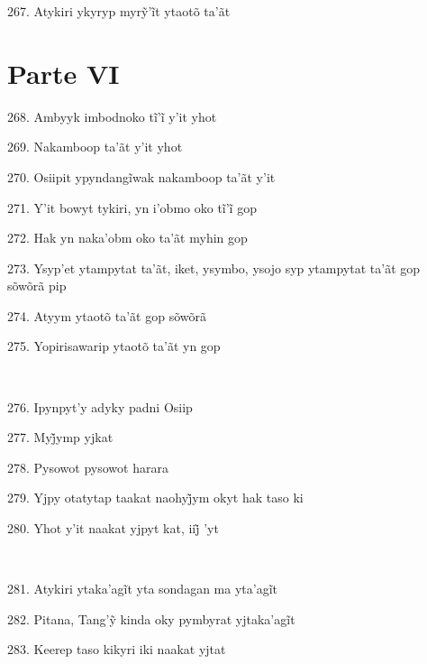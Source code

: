 267. Atykiri ykyryp myrỹ’ĩt ytaotõ ta’ãt

\section{Parte VI}

268. Ambyyk imbodnoko tĩ’ĩ y’it yhot

269. Nakamboop ta'ãt y'it yhot

270. Osiipit ypyndangĩwak nakamboop ta’ãt y’it

271. Y’it bowyt tykiri, yn i’obmo oko tĩ’ĩ gop

272. Hak yn naka'obm oko ta'ãt myhin gop

273. Ysyp'et ytampytat ta'ãt, iket, ysymbo, ysojo syp ytampytat ta'ãt gop sõwõrã pip

274. Atyym ytaotõ ta'ãt gop sõwõrã

275. Yopirisawarip ytaotõ ta'ãt yn gop

~

276. Ipynpyt'y adyky padni Osiip

277. Myj̃ymp yjkat

278. Pysowot pysowot harara

279. Yjpy otatytap taakat naohyj̃ym okyt hak taso ki

280. Yhot y’it naakat yjpyt kat, iij̃ ’yt

~

281. Atykiri ytaka’agĩt yta sondagan ma yta’agĩt

282. Pitana, Tang’ỹ kinda oky pymbyrat yjtaka’agĩt

283. Keerep taso kikyri iki naakat yjtat